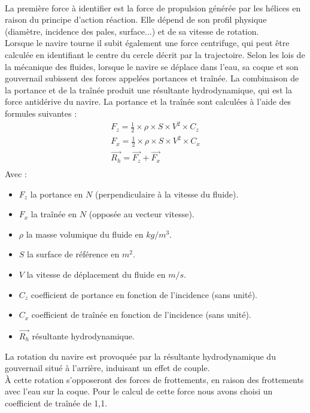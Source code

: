 \documentclass[a4paper,11pt]{article}
\begin{document}
    \paragraph{}
    La première force à identifier est la force de propulsion générée par les hélices en raison du principe d'action réaction. Elle dépend de son profil physique  (diamètre, incidence des pales, surface...) et de sa vitesse de rotation.\\
    Lorsque le navire tourne il subit également une force centrifuge, qui peut être calculée en identifiant le centre du cercle décrit par la trajectoire.
    Selon les lois de la mécanique des fluides, lorsque le navire se déplace dans l’eau, sa coque et son gouvernail subissent des forces appelées portances et traînée. La combinaison de la portance et de la traînée produit une résultante hydrodynamique, qui est la force antidérive du navire.
    La portance et la traînée sont calculées à l’aide des formules suivantes :\\
    \begin{gather*}
        F_{z} = \frac{1}{2} \times \rho \times S \times V^{2} \times C_{z}\\
        F_{x} = \frac{1}{2} \times \rho \times S \times V^{2} \times C_{x}\\
        \overrightarrow{R_{h}} = \overrightarrow{F_{z}} + \overrightarrow{F_{x}}\\
    \end{gather*}
    Avec :
    \begin{itemize}
        \item $F_{z}$ la portance en $N$ (perpendiculaire à la vitesse du fluide).
        \item $F_{x}$ la traînée en $N$ (opposée au vecteur vitesse).
        \item $\rho$ la masse volumique du fluide en $kg/m^{3}$.
        \item $S$ la surface de référence en $m^{2}$.
        \item $V$ la vitesse de déplacement du fluide en $m/s$.
        \item $C_{z}$ coefficient de portance en fonction de l'incidence (sans unité).
        \item $C_{x}$ coefficient de traînée en fonction de l'incidence (sans unité).
        \item $\overrightarrow{R_{h}}$ résultante hydrodynamique.
    \end{itemize}
    \vspace*{0.3cm}
    La rotation du navire est provoquée par la résultante hydrodynamique du gouvernail situé à l’arrière, induisant un effet de couple.\\
    À cette rotation s'opposeront des forces de frottements, en raison des frottements avec l'eau sur la coque. Pour le calcul de cette force nous avons choisi un coefficient de traînée de 1,1.
\end{document}
